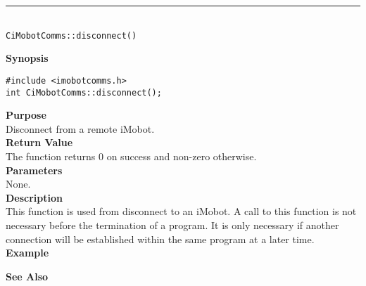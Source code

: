 \noindent
\vspace{5pt}
\rule{4.5in}{0.015in}\\
\noindent
{\LARGE \texttt{CiMobotComms::disconnect()}}\\
{}

\noindent
{\bf Synopsis}\\
\begin{verbatim}
#include <imobotcomms.h>
int CiMobotComms::disconnect();
\end{verbatim}

\noindent
{\bf Purpose}\\
Disconnect from a remote iMobot.\\

\noindent
{\bf Return Value}\\
The function returns 0 on success and non-zero otherwise.\\

\noindent
{\bf Parameters}\\
None.\\

\noindent
{\bf Description}\\
This function is used from disconnect to an iMobot. A call to this function is
not necessary before the termination of a program. It is only necessary if
another connection will be established within the same program at a later time.
\\

\noindent
{\bf Example}\\
\noindent

\noindent
{\bf See Also}\\

